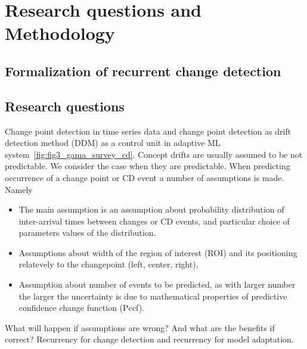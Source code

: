 \chapter{Research questions and Methodology}

\section{Formalization of recurrent change detection}



\section{Research questions}
Change point detection in time series data and change point detection as drift detection method (DDM) as a control unit in adaptive ML system~\ref{fig:fig3_gama_survey_cd}.
Concept drifts are usually assumed to be not predictable.
We consider the case when they are predictable.
When predicting occurrence of a change point or CD event a number of assumptions is made.
Namely
\begin{itemize}
  \item The main assumption is an assumption about probability distribution of inter-arrival times between changes or CD events, and particular choice of parameters values of the distribution. 
  \item Assumptions about width of the region of interest (ROI) and its positioning relatevely to the changepoint (left, center, right).
  \item Assumption about number of events to be predicted, as with larger number the larger the uncertainty is due to mathematical properties of predictive confidence change function (Pccf).
\end{itemize}
What will happen if assumptions are wrong? And what are the benefits if correct?
Recurrency for change detection and recurrency for model adaptation.


